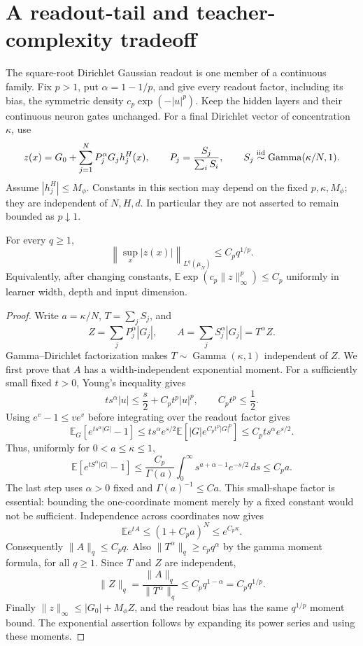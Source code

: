 \section{A readout-tail and teacher-complexity tradeoff}
\label{sec:power-readout-tradeoff}
The square-root Dirichlet Gaussian readout is one member of a continuous family. Fix $p>1$, put $\alpha=1-1/p$, and give every readout factor, including its bias, the symmetric density $c_p\exp(-|u|^p)$. Keep the hidden layers and their continuous neuron gates unchanged. For a final Dirichlet vector of concentration $\kappa$, use
\[
 z(x)=G_0+\sum_{j=1}^NP_j^\alpha G_jh_j^H(x),
 \qquad P_j=\frac{S_j}{\sum_iS_i},\qquad
 S_j\stackrel{\rm iid}{\sim}\operatorname{Gamma}(\kappa/N,1).
\]
Assume $|h_j^H|\le M_\phi$. Constants in this section may depend on the fixed $p,\kappa,M_\phi$; they are independent of $N,H,d$. In particular they are not asserted to remain bounded as $p\downarrow1$.

\begin{lemma}
\label{lem:power-readout-envelope}
For every $q\ge1$,
\[
 \left\|\sup_x|z(x)|\right\|_{L^q(\mu_N)}
       \le C_p q^{1/p}.
\]
Equivalently, after changing constants,
$\mathbb E\exp(c_p\|z\|_\infty^p)\le C_p$ uniformly in learner width, depth and input dimension.
\end{lemma}
\begin{proof}
Write $a=\kappa/N$, $T=\sum_jS_j$, and
\[
 Z=\sum_jP_j^\alpha|G_j|,\qquad
 A=\sum_jS_j^\alpha|G_j|=T^\alpha Z.
\]
Gamma--Dirichlet factorization makes $T\sim\operatorname{Gamma}(\kappa,1)$ independent of $Z$. We first prove that $A$ has a width-independent exponential moment. For a sufficiently small fixed $t>0$, Young's inequality gives
\[
 t s^\alpha|u|\le \frac s2+C_p t^p|u|^p,
 \qquad C_p t^p\le\frac12.
\]
Using $e^v-1\le ve^v$ before integrating over the readout factor gives
\[
 \mathbb E_G[e^{t s^\alpha|G|}-1]
 \le t s^\alpha e^{s/2}
              \mathbb E[|G|e^{C_p t^p|G|^p}]
 \le C_p t s^\alpha e^{s/2}.
\]
Thus, uniformly for $0<a\le\kappa\le1$,
\[
 \mathbb E[e^{t S^\alpha|G|}-1]
 \le\frac{C_p}{\Gamma(a)}
            \int_0^\infty s^{a+\alpha-1}e^{-s/2}\,ds
 \le C_p a.
\]
The last step uses $\alpha>0$ fixed and $\Gamma(a)^{-1}\le Ca$. This small-shape factor is essential: bounding the one-coordinate moment merely by a fixed constant would not be sufficient. Independence across coordinates now gives
\[
 \mathbb E e^{tA}\le(1+C_pa)^N\le e^{C_p\kappa}.
\]
Consequently $\|A\|_q\le C_p q$. Also
$\|T^\alpha\|_q\ge c_pq^\alpha$ by the gamma moment formula, for all $q\ge1$. Since $T$ and $Z$ are independent,
\[
 \|Z\|_q=\frac{\|A\|_q}{\|T^\alpha\|_q}
          \le C_p q^{1-\alpha}=C_p q^{1/p}.
\]
Finally $\|z\|_\infty\le|G_0|+M_\phi Z$, and the readout bias has the same $q^{1/p}$ moment bound. The exponential assertion follows by expanding its power series and using these moments.
\end{proof}

